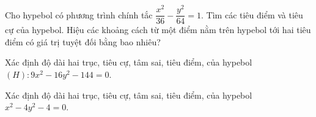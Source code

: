 \begin{bt}%
	Cho hypebol có phương trình chính tắc $\dfrac{x^{2}}{36}-\dfrac{y^{2}}{64}=1$. Tìm các tiêu điểm và tiêu cự của hypebol. Hiệu các khoảng cách từ một điểm nằm trên hypebol tới hai tiêu điểm có giá trị tuyệt đối bằng bao nhiêu?
\end{bt}

\begin{bt}%
	Xác định độ dài hai trục, tiêu cự, tâm sai, tiêu điểm, của hypebol $(H):9x^2-16y^2-144=0$.
\end{bt}

\begin{bt}%
	Xác định độ dài hai trục, tiêu cự, tâm sai, tiêu điểm, của hypebol $ x^2-4y^2-4=0$.
\end{bt}

